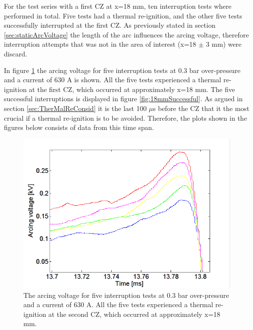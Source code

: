 \documentclass[10pt,b5paper,twoside]{article}
\begin{document}
For the test series with a first CZ at x=18 mm, ten interruption tests where performed in total. Five tests had a thermal re-ignition, and the other five tests successfully interrupted at the first CZ. As previously stated in section \ref{sec:staticArcVoltage} the length of the arc influences the arcing voltage, therefore interruption attempts that was not in the area of interest (x=18 $\pm$ 3 mm) were discard.

In figure \ref{fig:18mmUnSuccessful} the arcing voltage for five interruption tests at 0.3 bar over-pressure and a current of 630 A is shown. All the five tests experienced a thermal re-ignition at the first CZ, which occurred at approximately  x=18 mm. The five successful interruptions is displayed in figure \ref{fig:18mmSuccessful}. As argued in section \ref{sec:TherMalReConsid} it is the last 100 $\mu$s before the CZ that it the most crucial if a thermal re-ignition is to be avoided. Therefore, the plots shown in the figures below consists of data from this time span. 

\begin{figure}[H]
\centering
\includegraphics[scale=0.6, angle =0 ]{Bilder/Results/ArcingVoltage_18_reIgnition.png}
\caption{The arcing voltage for five interruption tests at 0.3 bar over-pressure and a current of 630 A. All the five tests experienced a thermal re-ignition at the second CZ, which occurred at approximately  x=18 mm.} \label{fig:18mmUnSuccessful}
\end{figure}
\end{document}
